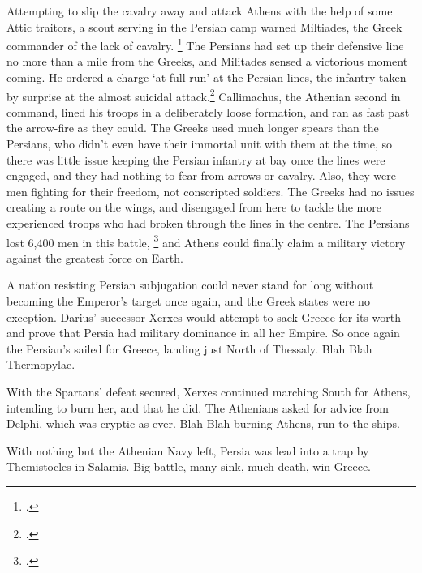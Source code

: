 \documentclass[twoside, a4paper, 12pt]{article}
\begin{document}
Attempting to slip the cavalry away and attack Athens with the help of some
Attic traitors, a scout serving in the Persian camp warned Miltiades, the Greek
commander of the lack of cavalry.
\footcite[35]{green_darius_west}
The Persians had set up their defensive line
no more than a mile from the Greeks, and Militades sensed a victorious moment
coming. He ordered a charge `at full run' at the Persian lines, the infantry
taken by surprise at the almost suicidal attack.\footcite[Book 6.112]{herodotus_1920}
Callimachus, the Athenian second in command, lined his troops in a
deliberately loose formation, and ran as fast past the arrow-fire as they could.
The Greeks used much longer spears than the Persians, who didn't even have their
immortal unit with them at the time, so there was little issue keeping the
Persian infantry at bay once the lines were engaged, and they had nothing to
fear from arrows or cavalry. Also, they were men fighting for their freedom,
not conscripted soldiers. The Greeks had no issues creating a route on the wings,
and disengaged from here to tackle the more experienced troops who had broken
through the lines in the centre. The Persians lost 6,400 men in this battle,
\footcite[37]{green_darius_west} and
Athens could finally claim a military victory against the greatest force on Earth.


\par\vspace{1em}

A nation resisting Persian subjugation could never stand for long without
becoming the Emperor's target once again, and the Greek states were no
exception. Darius' successor Xerxes would attempt to sack Greece for its worth
and prove that Persia had military dominance in all her Empire. So once again
the Persian's sailed for Greece, landing just North of Thessaly.
Blah Blah Thermopylae.

\par\vspace{1em}

With the Spartans' defeat secured, Xerxes continued marching South for
Athens, intending to burn her, and that he did. The Athenians asked for advice
from Delphi, which was cryptic as ever.
Blah Blah burning Athens, run to the ships.

\par\vspace{1em}

With nothing but the Athenian Navy left, Persia was lead into a trap
by Themistocles in Salamis. Big battle, many sink, much death, win Greece.
\end{document}
